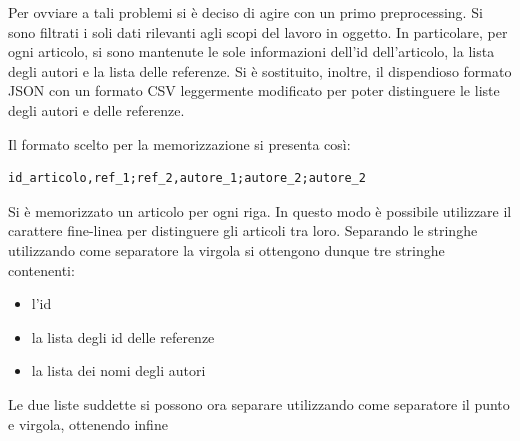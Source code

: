 \documentclass[a4paper,12pt]{article}
\begin{document}
Per ovviare a tali problemi si è deciso di agire con un primo preprocessing. Si sono filtrati i soli dati rilevanti agli scopi del lavoro in oggetto. In particolare, per ogni articolo, si sono mantenute le sole informazioni dell'id dell'articolo, la lista degli autori e la lista delle referenze. Si è sostituito, inoltre, il dispendioso formato JSON con un formato CSV leggermente modificato per poter distinguere le liste degli autori e delle referenze.
\par
Il formato scelto per la memorizzazione si presenta così:
\begin{lstlisting}[keepspaces=true]
id_articolo,ref_1;ref_2,autore_1;autore_2;autore_2
\end{lstlisting}
Si è memorizzato un articolo per ogni riga. In questo modo è possibile utilizzare il carattere fine-linea per distinguere gli articoli tra loro.
Separando le stringhe utilizzando come separatore la virgola si ottengono dunque tre stringhe contenenti:
\begin{itemize}
  \item l'id
  \item la lista degli id delle referenze
  \item la lista dei nomi degli autori
\end{itemize}
Le due liste suddette si possono ora separare utilizzando come separatore il punto e virgola, ottenendo infine 
\end{document}
